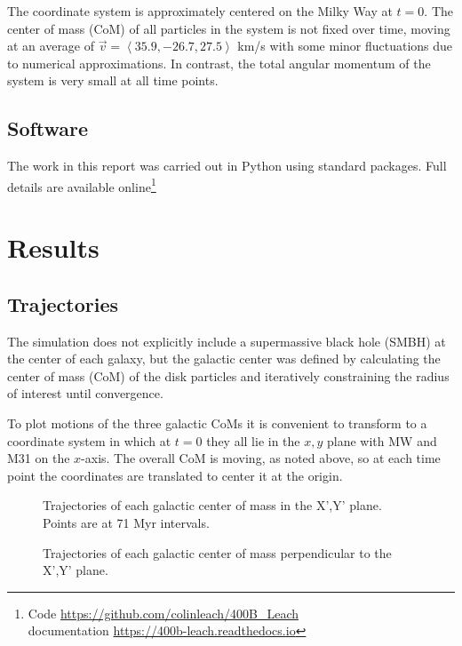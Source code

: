 \documentclass[twocolumn]{aastex63}
\begin{document}
The coordinate system is approximately centered on the Milky Way at $t=0$. The center of mass (CoM) of all particles in the system is not fixed over time, moving at an average of $\vec{v} = \left< 35.9, -26.7, 27.5 \right>$ km/s with some minor fluctuations due to numerical approximations. In contrast, the total angular momentum of the system is very small at all time points.

\subsection{Software}

The work in this report was carried out in Python using standard packages. Full details are available online\footnote{Code \url{https://github.com/colinleach/400B_Leach}\\documentation \url{https://400b-leach.readthedocs.io}}

\section{Results}

\subsection{Trajectories}

The simulation does not explicitly include a supermassive black hole (SMBH) at the center of each galaxy, but the galactic center was defined by calculating the center of mass (CoM) of the disk particles and iteratively constraining the radius of interest until convergence.

To plot motions of the three galactic CoMs it is convenient to transform to a coordinate system in which at $t=0$ they all lie in the $x,y$ plane with MW and M31 on the $x$-axis. The overall CoM is moving, as noted above, so at each time point the coordinates are translated to center it at the origin.

\begin{figure}[htb!]
	\caption{Trajectories of each galactic center of mass in the X',Y' plane. Points are at 71 Myr intervals.
		\label{fig:traj_xy}}
\end{figure}

\begin{figure}[htb!]
	\caption{Trajectories of each galactic center of mass perpendicular to the X',Y' plane.
		\label{fig:traj_z}}
\end{figure}
\end{document}
